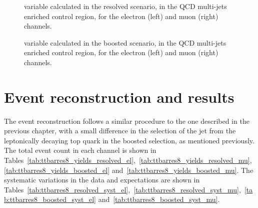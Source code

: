 \begin{sidewaysfigure}
\centering
{}
\caption{\mtt variable calculated in the resolved scenario, in the QCD multi-jets enriched control region, for the electron (left) and muon (right) channels.}
\label{fig:ttres8_qcd_mtt_resolved}
\end{sidewaysfigure}

\begin{sidewaysfigure}
\centering
{}
\caption{\mtt variable calculated in the boosted scenario, in the QCD multi-jets enriched control region, for the electron (left) and muon (right) channels.}
\label{fig:ttres8_qcd_mtt_boosted}
\end{sidewaysfigure}

\section{Event reconstruction and results}

The event reconstruction follows a similar procedure to the one described in the previous chapter,
with a small difference in the selection of the jet from the leptonically decaying top quark in the boosted selection, as mentioned previously.
The total event count in each channel is shown in Tables~\ref{tab:ttbarres8_yields_resolved_el},~\ref{tab:ttbarres8_yields_resolved_mu},~\ref{tab:ttbarres8_yields_boosted_el} and~\ref{tab:ttbarres8_yields_boosted_mu}. The systematic variations in the data and expectations are shown in Tables~\ref{tab:ttbarres8_resolved_syst_el},~\ref{tab:ttbarres8_resolved_syst_mu},~\ref{tab:ttbarres8_boosted_syst_el} and~\ref{tab:ttbarres8_boosted_syst_mu}.





